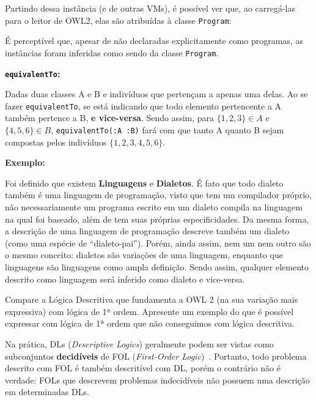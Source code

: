 \documentclass[answers]{exam}
\newcommand{\result}[2]{\textfile[firstline=#1, lastline=#2]{thesampleoutput}}
\begin{document}
\begin{questions}
\begin{answer}
            Partindo dessa instância (e de outras VMs), é possível ver que, ao
            carregá-las para o leitor de OWL2, elas são atribuídas à classe
            \texttt{Program}:

            \result{15}{17}

            É perceptível que, apesar de não declaradas explicitamente como
            programas, as instâncias foram inferidas como sendo da classe
            \texttt{Program}.

            \textbf{\texttt{equivalentTo}:}

            Dadas duas classes A e B e indivíduos que pertençam a apenas uma
            delas. Ao se fazer \texttt{equivalentTo}, se está indicando que
            todo elemento pertencente a A também pertence a B, \textbf{e
            vice-versa}.  Sendo assim, para $\{1, 2, 3\} \in A$ e $\{4, 5, 6\}
            \in B$, \texttt{equivalentTo(:A :B)} fará com que tanto A quanto B
            sejam compostas pelos indivíduos $\{1, 2, 3, 4, 5, 6\}$.

            \textbf{Exemplo:}

            Foi definido que existem \textbf{Linguagens} e \textbf{Dialetos}. É
            fato que todo dialeto também é uma linguagem de programação, visto
            que tem um compilador próprio, não necessariamente um programa
            escrito em um dialeto compila na linguagem na qual foi baseado,
            além de tem suas próprias especificidades. Da mesma forma, a
            descrição de uma linguagem de programação descreve também um
            dialeto (como uma espécie de ``dialeto-pai''). Porém, ainda assim,
            nem um nem outro são o mesmo conceito: dialetos são variações de
            uma linguagem, enquanto que linguagens são linguagens como ampla
            definição.  Sendo assim, qualquer elemento descrito como linguagem
            será inferido como dialeto e vice-versa.
        \end{answer}

        \question{}
        Compare a Lógica Descritiva que fundamenta a OWL 2 (na sua variação
        mais expressiva) com lógica de 1ª ordem. Apresente um exemplo do que é
        possível expressar com lógica de 1ª ordem que não conseguimos com
        lógica descritiva.

        \begin{answer}
            Na prática, DLs (\textit{Descriptive Logics}) geralmente podem ser
            vistas como subconjuntos \textbf{decidíveis} de FOL
            (\textit{First-Order Logic})~\cite{Tsarkov2003DLRV}. Portanto, todo
            problema descrito com FOL é também descritível com DL, porém o
            contrário não é verdade: FOLs que descrevem problemas indecidíveis
            não possuem uma descrição em determinadas DLs.


\end{answer}
\end{questions}
\end{document}
